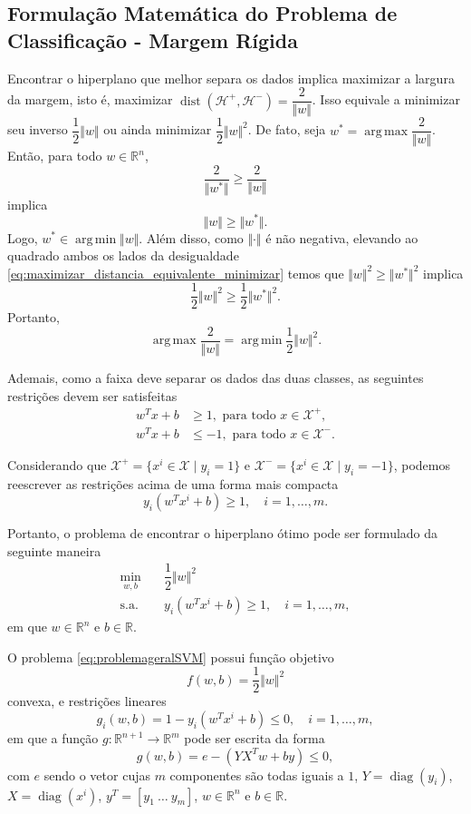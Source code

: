 \documentclass[12pt,a4paper]{scrartcl}
\DeclareMathOperator*{\argmax}{arg\, max}
\DeclareMathOperator*{\argmin}{arg\, min}
\DeclareMathOperator{\diag}{diag}
\DeclareMathOperator{\dist}{dist}
\def\Xset{\mathcal{X}}
\def\Hset{\mathcal{H}}
\def\RR{\mathds{R}}
\theoremstyle{definition}%
\begin{document}
\subsection{Formulação Matemática do Problema de Classificação - Margem Rígida}

Encontrar o hiperplano que melhor separa os dados implica maximizar a largura da margem, isto é, maximizar $\dist(\Hset^{+} , \Hset^{-}) =\dfrac{2}{\Vert w\Vert }$. Isso equivale a minimizar seu inverso $\dfrac{1}{2}\Vert w\Vert $ ou ainda minimizar $\dfrac{1}{2}\Vert w\Vert^{2}$. De fato, seja $w^{*}=\argmax\dfrac{2}{\Vert w\Vert}$. Então, para todo $w\in \RR^n$,
\[ 
\dfrac{2}{\Vert w^{*}\Vert} \geq \dfrac{2}{\Vert w\Vert} 
\]
implica
\[ \label{eq:maximizar_distancia_equivalente_minimizar} 
\Vert w\Vert \geq \Vert w^{*}\Vert. 
\]
Logo, $w^{*} \in \argmin\Vert w\Vert$. Além disso, como $\Vert \cdot \Vert$ é não negativa, elevando ao quadrado ambos os lados da desigualdade \eqref{eq:maximizar_distancia_equivalente_minimizar} temos que  $\Vert w\Vert^{2} \geq \Vert w^{*}\Vert^{2}$ implica
\[ 
\dfrac{1}{2}\Vert w\Vert^{2} \geq \dfrac{1}{2}\Vert w^{*}\Vert^{2}. 
\]
Portanto, 
\[ \argmax\dfrac{2}{\Vert w\Vert} = \argmin\dfrac{1}{2}\Vert w\Vert^2. \]

Ademais, como a faixa deve separar os dados das duas classes, as seguintes restrições devem ser satisfeitas
\begin{align}
w^{T}x+b &\geq 1 , \text{ para  todo } x\in \Xset^{+}, \\
w^{T}x+b &\leq -1 , \text{ para  todo } x\in \Xset^{-}.
\end{align}

Considerando que $\Xset^{+}=\{x^i \in \Xset\mid y_i=1\}$ e $\Xset^{-}=\{x^i \in \Xset \mid y_i=-1\}$, podemos reescrever as restrições acima de uma forma mais compacta 
\[ y_{i}(w^{T}x^{i}+b)\geq 1, \quad i=1, \ldots ,m. \]

Portanto, o problema de encontrar o hiperplano ótimo pode ser formulado da seguinte maneira
\[ \label{eq:problemageralSVM}
\begin{aligned}
\min_{w,b} & \quad \dfrac{1}{2} \Vert w\Vert^{2} \\
\text{s.a.} &  \quad y_i(w^{T}x^{i}+b) \geq 1, \quad i=1, \ldots , m, 
\end{aligned}
\]
em que $w\in \RR^{n}$ e $b\in \RR$. 

O problema \eqref{eq:problemageralSVM} possui função objetivo 
\[ f(w,b)=\dfrac{1}{2}\Vert w\Vert^{2} \]
convexa, e restrições lineares
\[ g_i(w,b)=1-y_i(w^{T}x^{i}+b) \leq 0, \quad i=1, \ldots, m, \]
em que a função $g:\RR^{n+1} \rightarrow \RR^{m}$ pode ser escrita da forma 
\[ g(w,b)= e - (YX^{T}w+by) \leq 0, \]
com $e$ sendo o vetor cujas $m$ componentes são todas iguais a $1$, $Y=\diag(y_{i})$, $X=\diag(x^{i})$, $y^{T}=[y_{1} \ \ldots \ y_{m}]$, $w\in \RR^n$ e $b\in \RR$.
\end{document}
